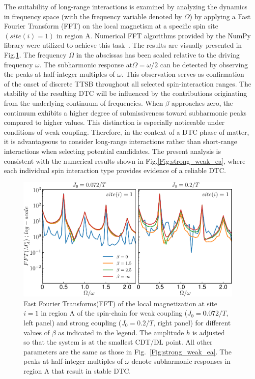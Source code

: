 \documentclass[12pt]{iopart}
\begin{document}
The suitability of long-range interactions is examined by analyzing the dynamics in frequency space (with the frequency variable denoted by $\Omega$) by applying a Fast Fourier Transform (FFT) on the local magnetism at a specific spin site $(site(i)=1)$ in region A. Numerical FFT algorithms provided by the NumPy library were utilized to achieve this task~\cite{harris2020array}. The results are visually presented in Fig.\ref{Fig:sz_single}.  The frequency $\Omega$ in the abscissas has been scaled relative to the driving frequency $\omega$. The subharmonic response at$\Omega=\omega/2$ can be detected by observing the peaks at half-integer multiples of $\omega$. This observation serves as confirmation of the onset of discrete TTSB throughout all selected spin-interaction ranges. The stability of the resulting DTC will be influenced by the contributions originating from the underlying continuum of frequencies. When $\beta$ approaches zero, the continuum exhibits a higher degree of submissiveness toward subharmonic peaks compared to higher values. This distinction is especially noticeable under conditions of weak coupling. Therefore, in the context of a DTC phase of matter, it is advantageous to consider long-range interactions rather than short-range interactions when selecting potential candidates. The present analysis is consistent with the numerical results shown in Fig.\ref{Fig:strong_weak_ea}, where each individual spin interaction type provides evidence of a reliable DTC.
\begin{figure}[t]
    \centering
    \includegraphics[width=10.cm]{single_sz_fft.pdf}
    \caption{Fast Fourier Transforms(FFT) of the local magnetization at site $i=1$ in region A of the spin-chain for weak coupling ($J_0 = 0.072/T$, left panel) and strong coupling ($J_0 = 0.2/T$, right panel) for different values of $\beta$ as indicated in the legend. The amplitude $h$ is adjusted so that the system is at the smallest CDT/DL point. All other parameters are the same as those in Fig.~\ref{Fig:strong_weak_ea}. The peaks at half-integer multiples of $\omega$ denote subharmonic responses in region A that result in stable DTC.}
    \label{Fig:sz_single}
\end{figure}
	
\end{document}
